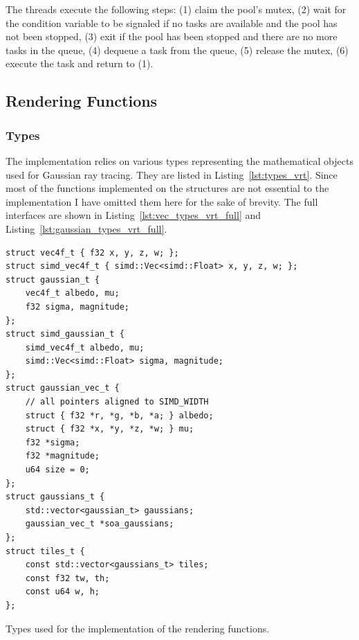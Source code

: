 \documentclass[a4paper, 11pt]{memoir}
\begin{document}
    The threads execute the following steps: (1) claim the pool's mutex, (2) wait for the condition variable to be
    signaled if no tasks are available and the pool has not been stopped, (3) exit if the pool has been stopped and
    there are no more tasks in the queue, (4) dequeue a task from the queue, (5) release the mutex, (6) execute the task
    and return to (1).


    \subsection{Rendering Functions}
    \label{sec:rendering_functions}

    \subsubsection{Types}
    The implementation relies on various types representing the mathematical objects used for Gaussian ray tracing. They
    are listed in Listing~\ref{lst:types_vrt}. Since most of the functions implemented on the structures are not essential
    to the implementation I have omitted them here for the sake of brevity. The full interfaces are shown in
    Listing~\ref{lst:vec_types_vrt_full} and Listing~\ref{lst:gaussian_types_vrt_full}.
    \begin{listing}[t]
        \begin{verbatim}
struct vec4f_t { f32 x, y, z, w; };
struct simd_vec4f_t { simd::Vec<simd::Float> x, y, z, w; };
struct gaussian_t {
    vec4f_t albedo, mu;
    f32 sigma, magnitude;
};
struct simd_gaussian_t {
    simd_vec4f_t albedo, mu;
    simd::Vec<simd::Float> sigma, magnitude;
};
struct gaussian_vec_t {
    // all pointers aligned to SIMD_WIDTH
    struct { f32 *r, *g, *b, *a; } albedo;
    struct { f32 *x, *y, *z, *w; } mu;
    f32 *sigma;
    f32 *magnitude;
    u64 size = 0;
};
struct gaussians_t {
    std::vector<gaussian_t> gaussians;
    gaussian_vec_t *soa_gaussians;
};
struct tiles_t {
    const std::vector<gaussians_t> tiles;
    const f32 tw, th;
    const u64 w, h;
};
        \end{verbatim}
        \caption{Types used for the implementation of the rendering functions.}
        \label{lst:types_vrt}
    \end{listing}
\end{document}
